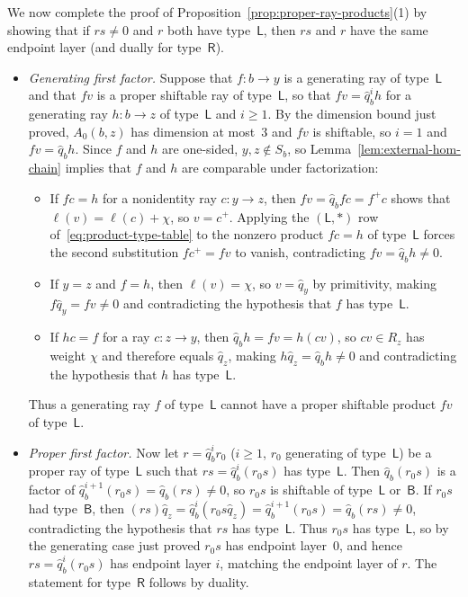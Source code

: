 We now complete the proof of Proposition~\ref{prop:proper-ray-products}(1) by showing that if $rs\ne0$ and $r$ both have type~$\mathsf L$, then $rs$ and $r$ have the same endpoint layer (and dually for type~$\mathsf R$).
\begin{itemize}
\item \emph{Generating first factor.} Suppose that $f\colon b\to y$ is a generating ray of type~$\mathsf L$ and that $fv$ is a proper shiftable ray of type~$\mathsf L$, so that $fv=\widehat q_b^ih$ for a generating ray $h\colon b\to z$ of type~$\mathsf L$ and $i\geq1$. By the dimension bound just proved, $A_0(b,z)$ has dimension at most~$3$ and $fv$ is shiftable, so $i=1$ and $fv=\widehat q_bh$. Since $f$ and $h$ are one-sided, $y,z\notin S_b$, so Lemma~\ref{lem:external-hom-chain} implies that $f$ and $h$ are comparable under factorization:
  \begin{itemize}
  \item If $fc=h$ for a nonidentity ray $c\colon y\to z$, then $fv=\widehat q_bfc=f^+\!c$ shows that $\ell(v)=\ell(c)+\chi$, so $v=c^+$. Applying the $(\mathsf L,*)$ row of~\eqref{eq:product-type-table} to the nonzero product $fc=h$ of type~$\mathsf L$ forces the second substitution $fc^+=fv$ to vanish, contradicting $fv=\widehat q_bh\ne0$.
  \item If $y=z$ and $f=h$, then $\ell(v)=\chi$, so $v=\widehat q_y$ by primitivity, making $f\widehat q_y=fv\ne0$ and contradicting the hypothesis that $f$ has type~$\mathsf L$.
  \item If $hc=f$ for a ray $c\colon z\to y$, then $\widehat q_bh=fv=h(cv)$, so $cv\in R_z$ has weight $\chi$ and therefore equals $\widehat q_z$, making $h\widehat q_z=\widehat q_bh\ne0$ and contradicting the hypothesis that $h$ has type~$\mathsf L$.
  \end{itemize}
  Thus a generating ray $f$ of type~$\mathsf L$ cannot have a proper shiftable product $fv$ of type~$\mathsf L$.

\item \emph{Proper first factor.} Now let $r=\widehat q_b^ir_0$ ($i\geq1$, $r_0$ generating of type~$\mathsf L$) be a proper ray of type~$\mathsf L$ such that $rs=\widehat q_b^i(r_0s)$ has type~$\mathsf L$. Then $\widehat q_b(r_0s)$ is a factor of $\widehat q_b^{i+1}(r_0s)=\widehat q_b(rs)\ne0$, so $r_0s$ is shiftable of type~$\mathsf L$ or~$\mathsf B$. If $r_0s$ had type~$\mathsf B$, then $(rs)\widehat q_z=\widehat q_b^i(r_0s\widehat q_z)=\widehat q_b^{i+1}(r_0s)=\widehat q_b(rs)\ne0$, contradicting the hypothesis that $rs$ has type~$\mathsf L$. Thus $r_0s$ has type~$\mathsf L$, so by the generating case just proved $r_0s$ has endpoint layer~$0$, and hence $rs=\widehat q_b^i(r_0s)$ has endpoint layer $i$, matching the endpoint layer of $r$. The statement for type~$\mathsf R$ follows by duality.
\end{itemize}

